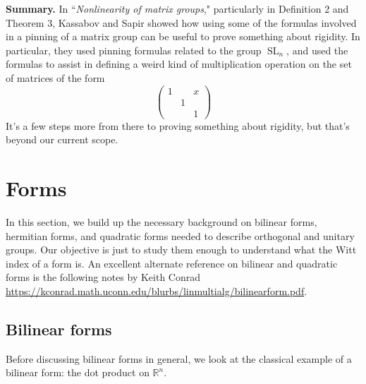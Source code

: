\documentclass[12pt]{article}
\theoremstyle{definition}
\newcommand{\R}{\mathbb{R}}
\newcommand{\tbf}{\textbf}
\newcommand{\noi}{\noindent}
\DeclareMathOperator{\SL}{SL}
\begin{document}
\bigskip

\noi \tbf{Summary.} In ``\textit{Nonlinearity of matrix groups}," particularly in Definition 2 and Theorem 3, Kassabov and Sapir showed how using some of the formulas involved in a pinning of a matrix group can be useful to prove something about rigidity. In particular, they used pinning formulas related to the group $\SL_n$, and used the formulas to assist in defining a weird kind of multiplication operation on the set of matrices of the form
\[
	\begin{pmatrix}
		1 && x \\
		& 1 \\
		&& 1
	\end{pmatrix}
\]
It's a few steps more from there to proving something about rigidity, but that's beyond our current scope.

\newpage
\section{Forms}
\label{forms}

In this section, we build up the necessary background on bilinear forms, hermitian forms, and quadratic forms needed to describe orthogonal and unitary groups. Our objective is just to study them enough to understand what the Witt index of a form is. An excellent alternate reference on bilinear and quadratic forms is the following notes by Keith Conrad \url{https://kconrad.math.uconn.edu/blurbs/linmultialg/bilinearform.pdf}.

\subsection{Bilinear forms}

Before discussing bilinear forms in general, we look at the classical example of a bilinear form: the dot product on $\R^n$.
\end{document}
